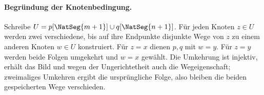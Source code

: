 \documentclass[main.tex]{subfiles}
\begin{document}
\paragraph{Begründung der Knotenbedingung.}\label{proof:internally-disjoint-cycle-node}
Schreibe \(U=p[\NatSeg{m+1}]\cup q[\NatSeg{n+1}]\).
Für jeden Knoten \(z\in U\) werden zwei verschiedene, bis auf ihre
Endpunkte disjunkte Wege von \(z\) zu einem anderen Knoten \(w\in U\)
konstruiert. Für \(z=x\) dienen \(p,q\) mit \(w=y\). Für \(z=y\)
werden beide Folgen umgekehrt und \(w=x\) gewählt. Die Umkehrung ist
injektiv, erhält das Bild und wegen der Ungerichtetheit auch die
Wegeigenschaft; zweimaliges Umkehren ergibt die ursprüngliche Folge,
also bleiben die beiden gespeicherten Wege verschieden.
\end{document}
